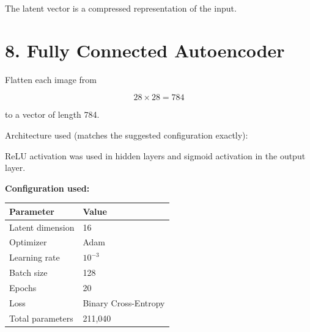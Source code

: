 \documentclass[10pt]{article}
\begin{document}
The latent vector is a compressed representation of the input.

\section*{8. Fully Connected Autoencoder}

Flatten each image from

\[
28\times28=784
\]

to a vector of length 784.

Architecture used (matches the suggested configuration exactly):

\begin{center}
\end{center}

ReLU activation was used in hidden layers and sigmoid activation in the output
layer.

\textbf{Configuration used:}

\begin{center}
\begin{tabular}{|l|l|}
\hline
Parameter & Value\\
\hline
Latent dimension & 16\\
Optimizer & Adam\\
Learning rate & $10^{-3}$\\
Batch size & 128\\
Epochs & 20\\
Loss & Binary Cross-Entropy\\
Total parameters & 211{,}040\\
\hline
\end{tabular}
\end{center}
\end{document}
